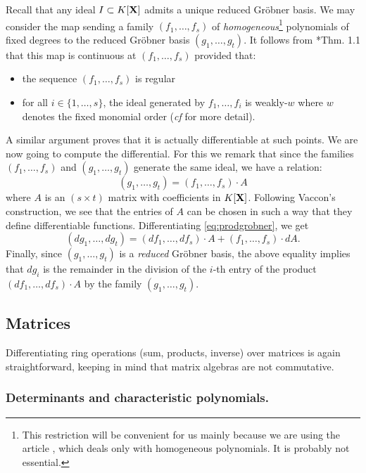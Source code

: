 \documentclass{lms}
\begin{document}
Recall that any 
ideal $I \subset K[\mathbf X]$ admits a unique reduced Gr\"obner basis. We may
consider the map sending a family $(f_1, \ldots, f_s)$ of 
\emph{homogeneous}\footnote{This restriction will be convenient for us 
mainly because we are using the article \cite{vaccon:14a}, which deals only 
with homogeneous polynomials. It is probably not essential.} 
polynomials of fixed degrees to the reduced Gr\"obner basis $(g_1, 
\ldots, g_t)$. It follows from \cite{vaccon:14a}*{Thm. 1.1} that this 
map is continuous at $(f_1, \ldots, f_s)$ provided that:
\begin{itemize}
\item the sequence $(f_1, \ldots, f_s)$ is regular
\item for all $i \in \{1, \ldots, s\}$, the ideal generated by
$f_1, \ldots, f_i$ is weakly-$w$ where $w$ denotes the fixed monomial
order (\emph{cf} \cite{vaccon:14a} for more detail).
\end{itemize}
A similar argument proves that it is actually differentiable at such
points. We are now going to compute the differential. For this we
remark that since the families $(f_1, \ldots, f_s)$ and $(g_1, \ldots,
g_t)$ generate the same ideal, we have a relation:
\begin{equation}
\label{eq:prodgrobner}
(g_1, \ldots, g_t) = (f_1, \ldots, f_s) \cdot A
\end{equation}
where $A$ is an $(s \times t)$ matrix with coefficients in $K[\mathbf X]$.
Following Vaccon's construction, we see that the entries of $A$ 
can be chosen in such a way that they define differentiable functions.
Differentiating \eqref{eq:prodgrobner}, we get
$$(d g_1, \ldots, d g_t) =
(d f_1, \ldots, d f_s) \cdot A + (f_1, \ldots, f_s) \cdot dA.$$
Finally, since $(g_1, \ldots, g_t)$ is a \emph{reduced} Gr\"obner
basis, the above equality implies that $d g_i$ is the remainder in
the division of the $i$-th entry of the product
$(d f_1, \ldots, d f_s) \cdot A$ by the family $(g_1, \ldots, g_t)$.

\subsection{Matrices}
\label{ssec:matrices}

Differentiating ring operations (sum, products, inverse) over matrices 
is again straightforward, keeping in mind that matrix algebras are not
commutative.

\subsubsection*{Determinants and characteristic polynomials.}
\end{document}
